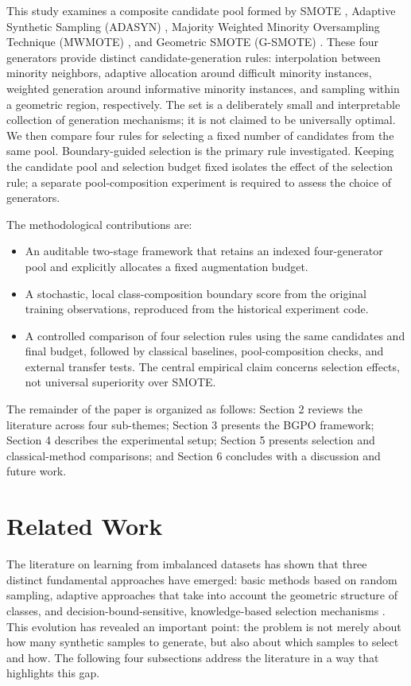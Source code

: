 \documentclass[pdflatex]{sn-jnl}
\begin{document}
This study examines a composite candidate pool formed by SMOTE \cite{ref07}, Adaptive Synthetic Sampling (ADASYN) \cite{ref18}, Majority Weighted Minority Oversampling Technique (MWMOTE) \cite{ref19}, and Geometric SMOTE (G-SMOTE) \cite{ref20}. These four generators provide distinct candidate-generation rules: interpolation between minority neighbors, adaptive allocation around difficult minority instances, weighted generation around informative minority instances, and sampling within a geometric region, respectively. The set is a deliberately small and interpretable collection of generation mechanisms; it is not claimed to be universally optimal. We then compare four rules for selecting a fixed number of candidates from the same pool. Boundary-guided selection is the primary rule investigated. Keeping the candidate pool and selection budget fixed isolates the effect of the selection rule; a separate pool-composition experiment is required to assess the choice of generators.

The methodological contributions are:
\begin{itemize}
\item An auditable two-stage framework that retains an indexed four-generator pool and explicitly allocates a fixed augmentation budget.
\item A stochastic, local class-composition boundary score from the original training observations, reproduced from the historical experiment code.
\item A controlled comparison of four selection rules using the same candidates and final budget, followed by classical baselines, pool-composition checks, and external transfer tests. The central empirical claim concerns selection effects, not universal superiority over SMOTE.
\end{itemize}

The remainder of the paper is organized as follows: Section 2 reviews the literature across four sub-themes; Section 3 presents the BGPO framework; Section 4 describes the experimental setup; Section 5 presents selection and classical-method comparisons; and Section 6 concludes with a discussion and future work.

\section{Related Work}\label{sec:2}

The literature on learning from imbalanced datasets has shown that three distinct fundamental approaches have emerged: basic methods based on random sampling, adaptive approaches that take into account the geometric structure of classes, and decision-bound-sensitive, knowledge-based selection mechanisms \cite{ref01} \cite{ref02} \cite{ref05}. This evolution has revealed an important point: the problem is not merely about how many synthetic samples to generate, but also about which samples to select and how. The following four subsections address the literature in a way that highlights this gap.
\end{document}
